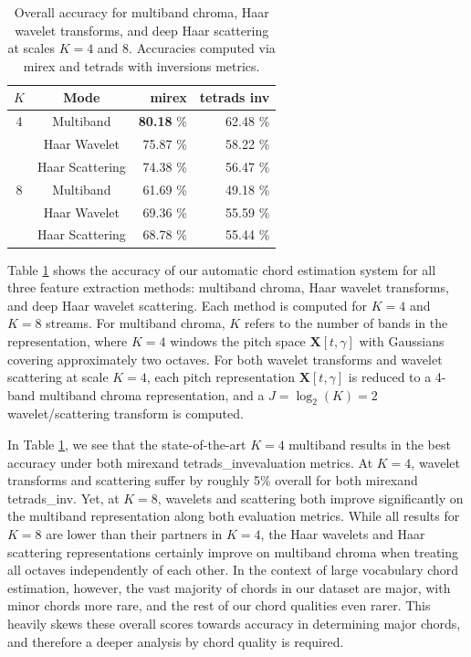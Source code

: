 \documentclass{article}
\newcommand{\mirex}{mirex}
\newcommand{\tetradsinv}{tetrads\_inv}
\begin{document}
\begin{table}
	\begin{center}
	\begin{tabular} {| c | c | r  | r |}
	\hline
	$K$ & Mode & mirex & tetrads inv \\
	\hline
	4 & Multiband & \textbf{80.18} \% & 62.48 \% \\
	& Haar Wavelet & 75.87 \%  & 58.22 \%\\
	& Haar Scattering & 74.38 \%  & 56.47 \% \\
	\hline
	8 & Multiband & 61.69 \% & 49.18 \% \\
	& Haar Wavelet & 69.36 \% & 55.59 \% \\
	& Haar Scattering & 68.78 \% & 55.44 \% \\
	\hline
	\end{tabular}
	\end{center}
	\protect\caption{Overall accuracy for multiband chroma, Haar wavelet transforms, and deep Haar scattering at scales $K=4$ and $8$. Accuracies computed via mirex and tetrads with inversions metrics.
	\label{table:overall-scores}}
\end{table}

Table \ref{table:overall-scores} shows the accuracy of our automatic chord estimation system for all three feature extraction methods: multiband chroma, Haar wavelet transforms, and deep Haar wavelet scattering. Each method is computed for $K=4$ and $K=8$ streams. For multiband chroma, $K$ refers to the number of bands in the representation, where $K=4$ windows the pitch space $\mathbf{X}[t, \gamma]$ with Gaussians covering approximately two octaves. For both wavelet transforms and wavelet scattering at scale $K=4$, each pitch representation $\mathbf{X}[t,\gamma]$ is reduced to a 4-band multiband chroma representation, and a $J=\log_2(K)=2$ wavelet/scattering transform is computed. 

In Table \ref{table:overall-scores}, we see that the state-of-the-art $K=4$ multiband results in the best accuracy under both \mirex and \tetradsinv evaluation metrics. At $K=4$, wavelet transforms and scattering suffer by roughly 5\% overall for both \mirex and \tetradsinv. Yet, at $K=8$, wavelets and scattering both improve significantly on the multiband representation along both evaluation metrics. While all results for $K=8$ are lower than their partners in $K=4$, the Haar wavelets and Haar scattering representations certainly improve on multiband chroma when treating all octaves independently of each other. In the context of large vocabulary chord estimation, however, the vast majority of chords in our dataset are major, with minor chords more rare, and the rest of our chord qualities even rarer. This heavily skews these overall scores towards accuracy in determining major chords, and therefore a deeper analysis by chord quality is required.
\end{document}
